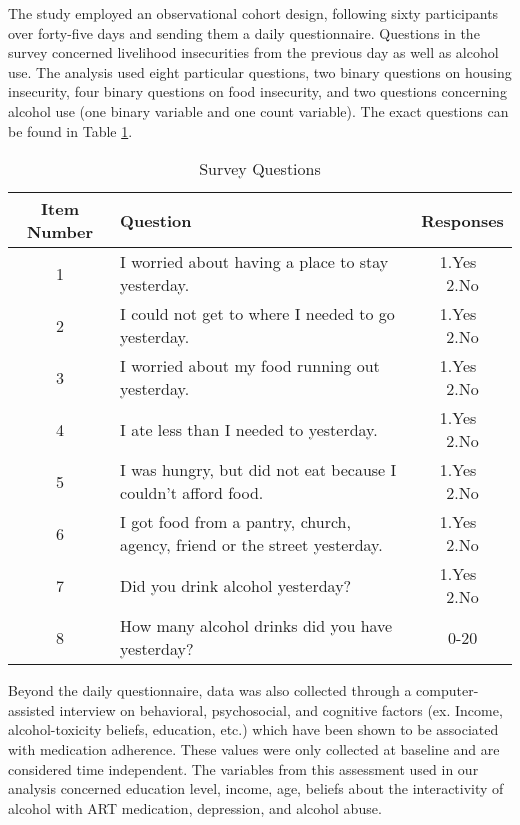 \documentclass{svjour3}                     %
\begin{document}
The study employed an observational cohort design, following sixty participants over forty-five days and sending them a daily questionnaire. Questions in the survey concerned livelihood insecurities from the previous day as well as alcohol use. The analysis used eight particular questions, two binary questions on housing insecurity, four binary questions on food insecurity, and two questions concerning alcohol use  (one binary variable and one count variable). The exact questions can be found in Table \ref{tab:table1}. \par
\begin{table}[t]
	\centering
	\caption{Survey Questions}
	\label{tab:table1}
	\begin{tabular}{cp{6.5cm}c}
		\toprule
		Item Number & Question & Responses\\
		\midrule
		1 & I worried about having a place to stay yesterday. & 1.Yes $\>$ 2.No \\
		2 & I could not get to where I needed to go yesterday. & 1.Yes $\>$ 2.No \\
		3 & I worried about my food running out yesterday. & 1.Yes $\>$ 2.No \\
		4 & I ate less than I needed to yesterday. & 1.Yes $\>$ 2.No \\
		5 & I was hungry, but did not eat because I couldn't afford food. & 1.Yes $\>$ 2.No \\
		6 & I got food from a pantry, church, agency, friend or the street yesterday. & 1.Yes $\>$ 2.No \\
		7 & Did you drink alcohol yesterday? & 1.Yes $\>$ 2.No \\
		8 & How many alcohol drinks did you have yesterday? & 0-20 \\
		\bottomrule
	\end{tabular}
\end{table}

Beyond the daily questionnaire, data was also collected through a computer-assisted interview on behavioral, psychosocial, and cognitive factors (ex. Income, alcohol-toxicity beliefs, education, etc.) which have been shown to be associated with medication adherence. These values were only collected at baseline and are considered time independent. The variables from this assessment used in our analysis concerned education level, income, age, beliefs about the interactivity of alcohol with ART medication, depression, and alcohol abuse. \par
\end{document}
